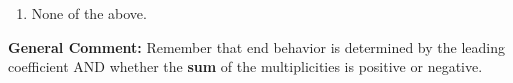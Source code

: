 \documentclass{extbook}[14pt]
\begin{document}
\begin{enumerate}
{\begin{enumerate}[label=\Alph*.]
\begin{multicols}{2}
\end{multicols}\item None of the above.\end{enumerate}
\textbf{General Comment:} Remember that end behavior is determined by the leading coefficient AND whether the \textbf{sum} of the multiplicities is positive or negative.
}
\end{enumerate}
\end{document}
